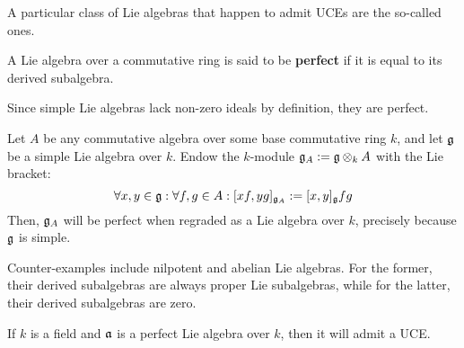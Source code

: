         A particular class of Lie algebras that happen to admit UCEs are the so-called  ones.
        \begin{definition}
            A Lie algebra over a commutative ring is said to be \textbf{perfect} if it is equal to its derived subalgebra. 
        \end{definition}
        \begin{example}
            Since simple Lie algebras lack non-zero ideals by definition, they are perfect. 
        \end{example}
        \begin{example}
            Let $A$ be any commutative algebra over some base commutative ring $k$, and let $\mathfrak{g}$ be a simple Lie algebra over $k$. Endow the $k$-module $\g_A := \g \tensor_k A$ with the Lie bracket:
                $$\forall x, y \in \mathfrak{g}: \forall f, g \in A: [x f, y g]_{\mathfrak{g}_A} := [x, y]_{\mathfrak{g}} fg$$
            Then, $\mathfrak{g}_A$ will be perfect when regraded as a Lie algebra over $k$, precisely because $\mathfrak{g}$ is simple.
        \end{example}
        \begin{example}
            Counter-examples include nilpotent and abelian Lie algebras. For the former, their derived subalgebras are always proper Lie subalgebras, while for the latter, their derived subalgebras are zero. 
        \end{example}
        \begin{proposition} \label{prop: perfect_lie_algebras_admit_UCEs}
            \cite[Lemma 1.10]{garland_arithmetics_of_loop_groups} If $k$ is a field and $\mathfrak{a}$ is a perfect Lie algebra over $k$, then it will admit a UCE.
        \end{proposition}